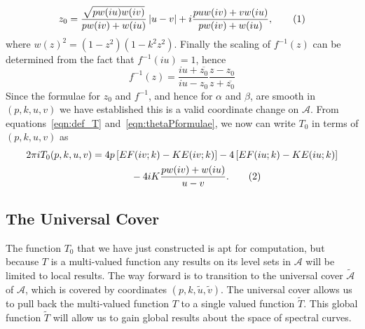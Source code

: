 \documentclass{article}
\numberwithin{equation}{section}
\numberwithin{figure}{section}
\newcommand{\labelthis}[1]{\addtocounter{equation}{1}\tag{\theequation}\label{#1}}
\renewcommand*{\bar}{\overline}
\newcommand{\abs}[1]{\left|#1\right|}
\newcommand{\iu}{i}
\begin{document}
\[
z_0 = \frac{\sqrt{pw(\iu u)w(\iu v)}}{pw(\iu v) + w(\iu u)} \abs{u-v} + \iu\frac{puw(\iu v) + vw(\iu u)}{pw(\iu v) + w(\iu u)},
\labelthis{eqn:formula xy}
\]
where $w(z)^2 = (1-z^2)(1-k^2z^2)$. Finally the scaling of $f^{-1}(z)$ can be determined from the fact that $f^{-1}(\iu u) = 1$, hence 
\[
f^{-1}(z)
=  \frac{\iu u + \bar{z_0}}{\iu u - z_0} \frac{z-z_0}{z + \bar{z_0}}
\]
Since the formulae for $z_0$ and $f^{-1}$, and hence for $\alpha$ and $\beta$, are smooth in $(p,k,u,v)$ we have established this is a valid coordinate change on $\mathcal{A}$. From equations~\eqref{eqn:def_T} and~\eqref{eqn:thetaPformulae}, we now can write $T_0$ in terms of $(p,k,u,v)$ as
\begin{align*}
2\pi\iu T_0(p,k,u,v)
&= 4p \left[ E F(\iu v;k) - K E(\iu v;k) \right] - 4\left[ E F(\iu u;k) - K E(\iu u;k) \right] \\
&\qquad\qquad - 4\iu K \frac{p w(\iu v) + w(\iu u)}{u-v}.
\labelthis{eqn:Teqn}
\end{align*}





















\subsection{The Universal Cover}\label{sub:Universal Cover}

The function $T_0$ that we have just constructed is apt for computation, but because $T$ is a multi-valued function any results on its level sets in $\mathcal{A}$ will be limited to local results. The way forward is to transition to the universal cover $\mathcal{\tilde{A}}$ of $\mathcal{A}$, which is covered by coordinates $(p,k,\tilde{u},\tilde{v})$. The universal cover allows us to pull back the multi-valued function $T$ to a single valued function $\tilde{T}$. This global function $\tilde{T}$ will allow us to gain global results about the space of spectral curves.
\end{document}
